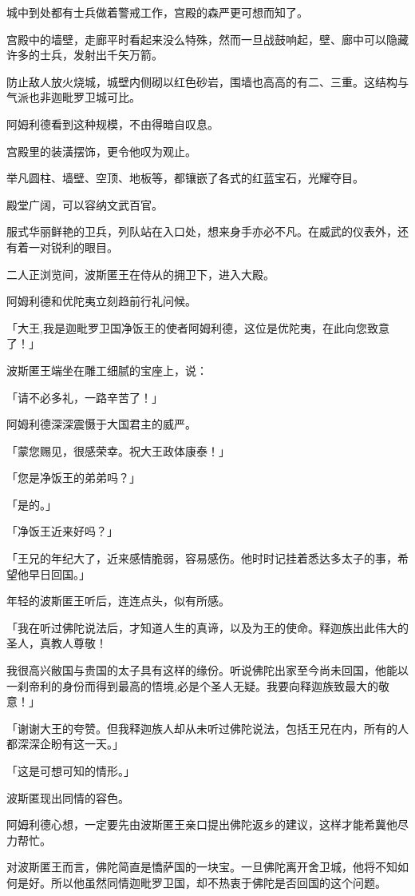 \documentclass[twoside,openany]{book}
\begin{document}
城中到处都有士兵做着警戒工作，宫殿的森严更可想而知了。

宫殿中的墙壁，走廊平时看起来没么特殊，然而一旦战鼓响起，壁、廊中可以隐藏许多的士兵，发射出千矢万箭。

防止敌人放火烧城，城壁内侧砌以红色砂岩，围墙也高高的有二、三重。这结构与气派也非迦毗罗卫城可比。

阿姆利德看到这种规模，不由得暗自叹息。

宫殿里的装潢摆饰，更令他叹为观止。

举凡圆柱、墙壁、空顶、地板等，都镶嵌了各式的红蓝宝石，光耀夺目。

殿堂广阔，可以容纳文武百官。

服式华丽鲜艳的卫兵，列队站在入口处，想来身手亦必不凡。在威武的仪表外，还有着一对锐利的眼目。

二人正浏览间，波斯匿王在侍从的拥卫下，进入大殿。

阿姆利德和优陀夷立刻趋前行礼问候。

「大王,我是迦毗罗卫国净饭王的使者阿姆利德，这位是优陀夷，在此向您致意了！」

波斯匿王端坐在雕工细腻的宝座上，说：

「请不必多礼，一路辛苦了！」

阿姆利德深深震慑于大国君主的威严。

「蒙您赐见，很感荣幸。祝大王政体康泰！」

「您是净饭王的弟弟吗？」

「是的。」

「净饭王近来好吗？」

「王兄的年纪大了，近来感情脆弱，容易感伤。他时时记挂着悉达多太子的事，希望他早日回国。」

年轻的波斯匿王听后，连连点头，似有所感。

「我在听过佛陀说法后，才知道人生的真谛，以及为王的使命。释迦族出此伟大的圣人，真教人尊敬！

我很高兴敝国与贵国的太子具有这样的缘份。听说佛陀出家至今尚未回国，他能以一刹帝利的身份而得到最高的悟境,必是个圣人无疑。我要向释迦族致最大的敬意！」

「谢谢大王的夸赞。但我释迦族人却从未听过佛陀说法，包括王兄在内，所有的人都深深企盼有这一天。」

「这是可想可知的情形。」

波斯匿现出同情的容色。

阿姆利德心想，一定要先由波斯匿王亲口提出佛陀返乡的建议，这样才能希冀他尽力帮忙。

对波斯匿王而言，佛陀简直是憍萨国的一块宝。一旦佛陀离开舍卫城，他将不知如何是好。所以他虽然同情迦毗罗卫国，却不热衷于佛陀是否回国的这个问题。
\end{document}
